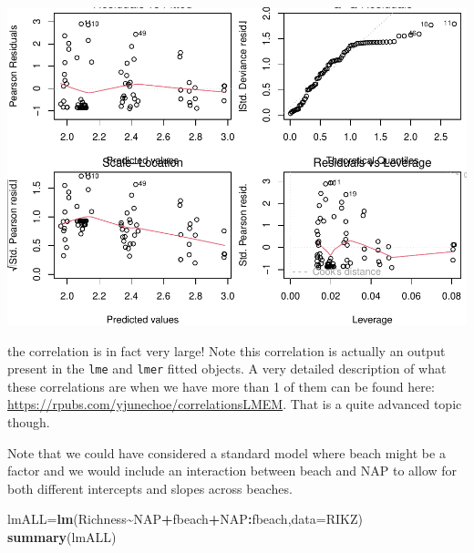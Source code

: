 \documentclass[
]{book}
\newenvironment{Shaded}{\begin{snugshade}}{\end{snugshade}}
\newcommand{\AttributeTok}[1]{\textcolor[rgb]{0.13,0.29,0.53}{#1}}
\newcommand{\FunctionTok}[1]{\textcolor[rgb]{0.13,0.29,0.53}{\textbf{#1}}}
\newcommand{\NormalTok}[1]{#1}
\newcommand{\OtherTok}[1]{\textcolor[rgb]{0.56,0.35,0.01}{#1}}
\newcommand{\SpecialCharTok}[1]{\textcolor[rgb]{0.81,0.36,0.00}{\textbf{#1}}}
\begin{document}
\includegraphics{ECOMODbook_files/figure-latex/unnamed-chunk-81-1.pdf}

the correlation is in fact very large! Note this correlation is actually an output present in the \texttt{lme} and \texttt{lmer} fitted objects. A very detailed description of what these correlations are when we have more than 1 of them can be found here: \url{https://rpubs.com/yjunechoe/correlationsLMEM}. That is a quite advanced topic though.

Note that we could have considered a standard model where beach might be a factor and we would include an interaction between beach and NAP to allow for both different intercepts and slopes across beaches.

\begin{Shaded}
\begin{Highlighting}[]
\NormalTok{lmALL}\OtherTok{=}\FunctionTok{lm}\NormalTok{(Richness}\SpecialCharTok{\textasciitilde{}}\NormalTok{NAP}\SpecialCharTok{+}\NormalTok{fbeach}\SpecialCharTok{+}\NormalTok{NAP}\SpecialCharTok{:}\NormalTok{fbeach,}\AttributeTok{data=}\NormalTok{RIKZ)}
\FunctionTok{summary}\NormalTok{(lmALL)}
\end{Highlighting}
\end{Shaded}
\end{document}
